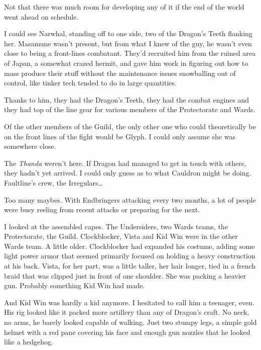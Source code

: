 Not that there was much room for developing any of it if the end of the world went ahead on schedule.



I could see Narwhal, standing off to one side, two of the Dragon's Teeth flanking her.  Masamune wasn't present, but from what I knew of the guy, he wasn't even close to being a front-lines combatant.   They'd recruited him from the ruined area of Japan, a somewhat crazed hermit, and gave him work in figuring out how to mass produce their stuff without the maintenance issues snowballing out of control, like tinker tech tended to do in large quantities.



Thanks to him, they had the Dragon's Teeth, they had the combat engines and they had top of the line gear for various members of the Protectorate and Wards.



Of the other members of the Guild, the only other one who could theoretically be on the front lines of the fight would be Glyph.  I could only assume she was somewhere close.



The \emph{Thanda} weren't here.  If Dragon had managed to get in touch with others, they hadn't yet arrived.  I could only guess as to what Cauldron might be doing.  Faultline's crew, the Irregulars\ldots



Too many maybes.  With Endbringers attacking every two months, a lot of people were busy reeling from recent attacks or preparing for the next.



I looked at the assembled capes.  The Undersiders, two Wards teams, the Protectorate, the Guild.  Clockblocker, Vista and Kid Win were in the other Wards team.  A little older.  Clockblocker had expanded his costume, adding some light power armor that seemed primarily focused on holding a heavy construction at his back.  Vista, for her part, was a little taller, her hair longer, tied in a french braid that was clipped just in front of one shoulder. She was packing a heavier gun.  Probably something Kid Win had made.



And Kid Win was hardly a kid anymore.  I hesitated to call him a teenager, even.  His rig looked like it packed more artillery than any of Dragon's craft.  No neck, no arms, he barely looked capable of walking.  Just two stumpy legs, a simple gold helmet with a red pane covering his face and enough gun nozzles that he looked like a hedgehog.



